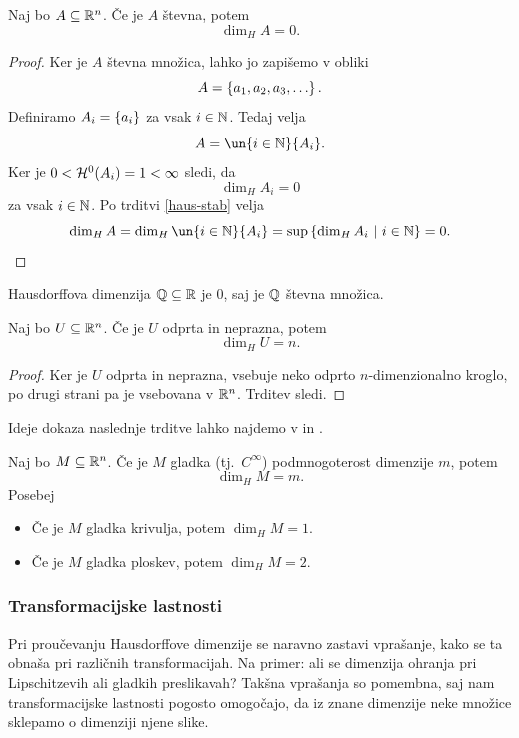 \begin{trditev}
    Naj bo \(A \subseteq \mathbb{R}^n\). Če je \(A\) števna, potem 
    \[\dim_H A = 0.\]
\end{trditev}

\begin{proof}
    Ker je \(A\) števna množica, lahko jo zapišemo v obliki 
    \[A = \left\{a_1, a_2, a_3, \ldots\right\}.\]
    Definiramo \(A_i = \left\{a_i\right\}\) za vsak \(i \in \mathbb{N}\). Tedaj velja
    \[A = \un{i \in \N}{A_i}.\]
    Ker je \(0 < \mathcal{H}^0(A_i) = 1 < \infty\) sledi, da 
    \[\dim_H A_i = 0\]
    za vsak \(i \in \mathbb{N}\).
    Po trditvi \ref{haus-stab} velja
    \[\dim_H A = \dim_H \un{i \in \N}{A_i} = \sup \setb{\dim_H A_i}{i \in \N} = 0.\]
\end{proof}

\begin{zgled}
    Hausdorffova dimenzija \(\mathbb{Q} \subseteq \mathbb{R}\) je \(0\), saj je \(\mathbb{Q}\) števna množica. 
\end{zgled}

\begin{trditev}
    \label{haus-odp}
    Naj bo \(U \subseteq \mathbb{R}^n\). Če je \(U\) odprta in neprazna, potem 
    \[\dim_H U = n.\]
\end{trditev}

\begin{proof}
    Ker je \(U\) odprta in neprazna, vsebuje neko odprto \(n\)-dimenzionalno kroglo, po drugi strani pa je vsebovana v \(\mathbb{R}^n\). Trditev sledi.
\end{proof}

Ideje dokaza naslednje trditve lahko najdemo v \cite[stran 32]{fk-fg} in \cite[stran 351]{f-ra}.
\begin{trditev}
    Naj bo \(M \subseteq \mathbb{R}^n\). Če je \(M\) gladka (tj.\ \(C^\infty\)) podmnogoterost dimenzije \(m\), potem 
    \[\dim_H M = m.\]
    Posebej 
    \begin{itemize}
        \item Če je \(M\) gladka krivulja, potem \(\dim_H M = 1.\)
        \item Če je \(M\) gladka ploskev, potem \(\dim_H M = 2.\)
    \end{itemize}
\end{trditev}

\subsubsection{Transformacijske lastnosti}
Pri proučevanju Hausdorffove dimenzije se naravno zastavi vprašanje, kako se ta obnaša pri različnih transformacijah. Na primer: ali se dimenzija ohranja pri Lipschitzevih ali gladkih preslikavah? Takšna vprašanja so pomembna, saj nam transformacijske lastnosti pogosto omogočajo, da iz znane dimenzije neke množice sklepamo o dimenziji njene slike.

